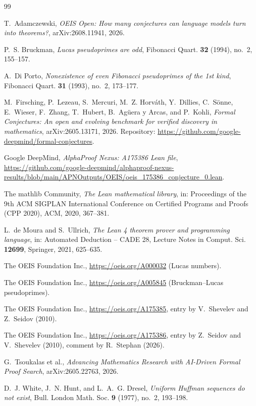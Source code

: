 \documentclass[11pt]{amsart}
\theoremstyle{plain}
\theoremstyle{definition}
\begin{document}
\begin{thebibliography}{99}

T.~Adamczewski, \emph{OEIS Open: How many conjectures can language models turn into theorems?}, arXiv:2608.11941, 2026.

P.~S. Bruckman, \emph{Lucas pseudoprimes are odd}, Fibonacci Quart. \textbf{32} (1994), no.~2, 155--157.

A.~Di Porto, \emph{Nonexistence of even Fibonacci pseudoprimes of the 1st kind}, Fibonacci Quart. \textbf{31} (1993), no.~2, 173--177.

M.~Firsching, P.~Lezeau, S.~Mercuri, M.~Z. Horv\'ath, Y.~Dillies, C.~S\"onne, E.~Wieser, F.~Zhang, T.~Hubert, B.~Ag\"uera y Arcas, and P.~Kohli, \emph{Formal Conjectures: An open and evolving benchmark for verified discovery in mathematics}, arXiv:2605.13171, 2026. Repository: \url{https://github.com/google-deepmind/formal-conjectures}.

Google DeepMind, \emph{AlphaProof Nexus: A175386 Lean file}, \url{https://github.com/google-deepmind/alphaproof-nexus-results/blob/main/APNOutputs/OEIS/oeis_175386_conjecture_0.lean}.

The mathlib Community, \emph{The Lean mathematical library}, in: Proceedings of the 9th ACM SIGPLAN International Conference on Certified Programs and Proofs (CPP 2020), ACM, 2020, 367--381.

L.~de Moura and S.~Ullrich, \emph{The Lean 4 theorem prover and programming language}, in: Automated Deduction -- CADE 28, Lecture Notes in Comput. Sci. \textbf{12699}, Springer, 2021, 625--635.

The OEIS Foundation Inc., \url{https://oeis.org/A000032} (Lucas numbers).

The OEIS Foundation Inc., \url{https://oeis.org/A005845} (Bruckman--Lucas pseudoprimes).

The OEIS Foundation Inc., \url{https://oeis.org/A175385}, entry by V.~Shevelev and Z.~Seidov (2010).

The OEIS Foundation Inc., \url{https://oeis.org/A175386}, entry by Z.~Seidov and V.~Shevelev (2010), comment by R.~Stephan (2026).

G.~Tsoukalas et al., \emph{Advancing Mathematics Research with AI-Driven Formal Proof Search}, arXiv:2605.22763, 2026.

D.~J. White, J.~N. Hunt, and L.~A.~G. Dresel, \emph{Uniform Huffman sequences do not exist}, Bull. London Math. Soc. \textbf{9} (1977), no.~2, 193--198.

\end{thebibliography}
\end{document}
